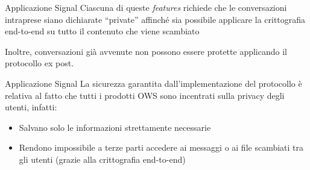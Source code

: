 \begin{frame}{Applicazione Signal}
    Ciascuna di queste \textit{features} richiede che le conversazioni intraprese siano dichiarate “private” affinché sia possibile applicare la crittografia end-to-end su tutto il contenuto che viene scambiato\newline\pause 

    Inoltre, conversazioni già avvenute non possono essere protette applicando il protocollo ex post.

\end{frame}

\begin{frame}{Applicazione Signal}
    La sicurezza garantita dall'implementazione del protocollo è relativa al fatto che tutti i prodotti OWS sono incentrati sulla privacy degli utenti, infatti:
    \begin{itemize}
        \item Salvano solo le informazioni strettamente necessarie\pause
        \item Rendono impossibile a terze parti accedere ai messaggi o ai file scambiati tra gli utenti (grazie alla crittografia end-to-end)
    \end{itemize}
\end{frame}